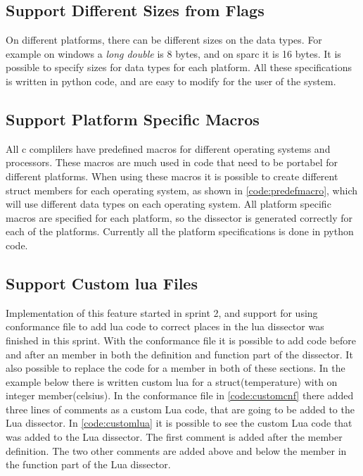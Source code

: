 \subsection{Support Different Sizes from Flags}
On different platforms, there can be different sizes on the data types. For 
example on windows a \emph{long double} is 8 bytes, and on sparc it is 16 
bytes. It is possible to specify sizes for data types for each platform. All 
these specifications is written in python code, and are easy to modify for the 
user of the system.

\subsection{Support Platform Specific Macros}
All c complilers have predefined macros for different operating systems and 
processors. These macros are much used in code that need to be portabel for 
different platforms. When using these macros it is possible to create 
different struct members for each operating system, as shown in 
\autoref{code:predefmacro}, which will use different data types on each 
operating system. All platform specific macros are specified for each 
platform, so the dissector is generated correctly for each of the platforms. 
Currently all the platform specifications is done in python code.



\subsection{Support Custom \Gls{lua} Files}
Implementation of this feature started in sprint 2, and support for using 
conformance file to add lua code to correct places in the lua dissector was 
finished in this sprint. With the conformance file it is possible to add code 
before and after an member in both the definition and function part of the 
dissector. It also possible to replace the code for a member in both of these 
sections. In the example below there is written custom lua for a 
struct(temperature) with on integer member(celsius). In the conformance file 
in \autoref{code:customcnf} there added three lines of comments as a custom 
Lua code, that are going to be added to the Lua dissector. In 
\autoref{code:customlua} it is possible to see the custom Lua code that was 
added to the Lua dissector. The first comment is added after the member 
definition. The two other comments are added above and below the member in the 
function part of the Lua dissector.

